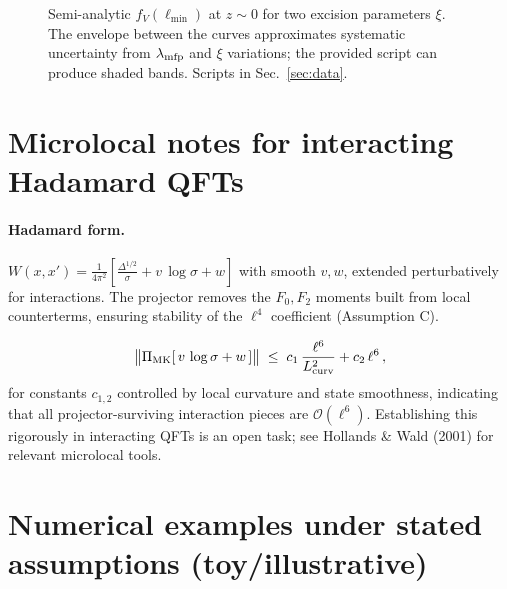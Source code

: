 \documentclass[aps,prd,onecolumn,superscriptaddress,nofootinbib]{revtex4-2}
\begin{document}
\begin{figure}[h]
\centering
{}
\caption{Semi-analytic \(f_V(\ell_{\min})\) at \(z\!\sim\!0\) for two excision parameters \(\xi\). The envelope between the curves approximates systematic uncertainty from \(\lambda_{\rm mfp}\) and \(\xi\) variations; the provided script can produce shaded bands. Scripts in Sec.~\ref{sec:data}.}
\label{fig:fV}
\end{figure}

\section{Microlocal notes for interacting Hadamard QFTs}
\label{app:microlocal}
\paragraph{Hadamard form.}
\(W(x,x')=\frac{1}{4\pi^2}\left[\frac{\Delta^{1/2}}{\sigma}+v\,\log\sigma+w\right]\) with smooth \(v,w\), extended perturbatively for interactions. The projector removes the \(F_0,F_2\) moments built from local counterterms, ensuring stability of the \(\ell^4\) coefficient (Assumption C).

\[
\big\|\Pi_{\rm MK}[\,v\,\log\sigma + w\,]\big\| \;\le\; c_1\,\frac{\ell^6}{L_{\rm curv}^2} + c_2\,\ell^6 \,,
\]
for constants \(c_{1,2}\) controlled by local curvature and state smoothness, indicating that all projector-surviving interaction pieces are \(\mathcal O(\ell^6)\). Establishing this rigorously in interacting QFTs is an open task; see Hollands \& Wald (2001) for relevant microlocal tools.

\section{Numerical examples under stated assumptions (toy/illustrative)}
\label{app:numerics}
\end{document}
